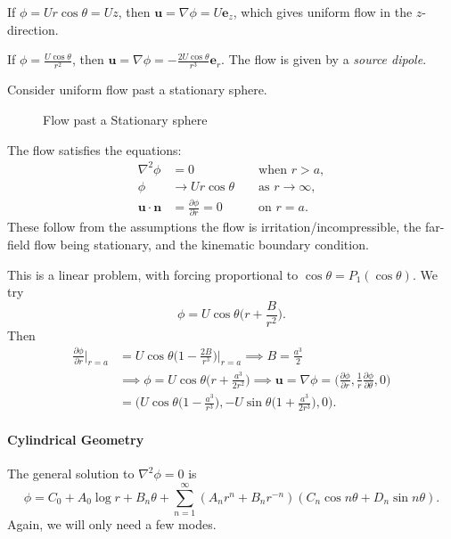 \documentclass[12pt]{article}
\begin{document}
If $\phi = U r \cos \theta = Uz$, then $\mathbf{u} = \nabla \phi = U \mathbf{e}_z$, which gives uniform flow in the $z$-direction.

If $\phi = \frac{U\cos \theta}{r^2}$, then $\mathbf{u} = \nabla \phi = - \frac{2 U \cos \theta}{r^3} \mathbf{e}_r$. The flow is given by a \emph{source dipole}.

Consider uniform flow past a stationary sphere.
\begin{figure}[h]
	\centering
	\caption{Flow past a Stationary sphere}
	\label{fig:sphere_flow}
\end{figure}

The flow satisfies the equations:
\begin{align*}
	\nabla^2 \phi &= 0  & &\text{ when } r > a, \\
	\phi &\to U r \cos \theta & &\text{ as } r \to \infty, \\
	\mathbf{u} \cdot \mathbf{n} &= \frac{\partial \phi}{\partial r} = 0 & &\text{ on } r = a.
\end{align*}
These follow from the assumptions the flow is irritation/incompressible, the far-field flow being stationary, and the kinematic boundary condition.

This is a linear problem, with forcing proportional to $\cos \theta = P_1(\cos \theta)$. We try
\[
\phi = U \cos \theta \biggl(r + \frac{B}{r^2} \biggr).
\]
Then
\begin{align*}
	\frac{\partial \phi}{\partial r} \biggr|_{r = a} &= U \cos \theta \biggl( 1 - \frac{2B}{r^3} \biggr) \biggr|_{r = a} \implies B = \frac{a^3}{2} \\
							 &\implies \phi = U \cos \theta \biggl( r + \frac{a^3}{2r^2}\biggr) \implies \mathbf{u} = \nabla \phi = \biggl( \frac{\partial \phi}{\partial r}, \frac{1}{r} \frac{\partial \phi}{\partial \theta}, 0 \biggr) \\
							 &= \biggl( U \cos \theta \biggl( 1 - \frac{a^3}{r^3} \biggr), - U \sin \theta \biggl(1 + \frac{a^3}{2r^3} \biggr), 0 \biggr).
\end{align*}

\paragraph{Cylindrical Geometry} The general solution to $\nabla^2 \phi = 0$ is
\[
\phi = C_0 + A_0 \log r + B_n \theta + \sum_{n = 1}^{\infty} (A_n r^{n} + B_nr^{-n})(C_n \cos n \theta + D_n \sin n \theta).
\]
Again, we will only need a few modes.
\end{document}
